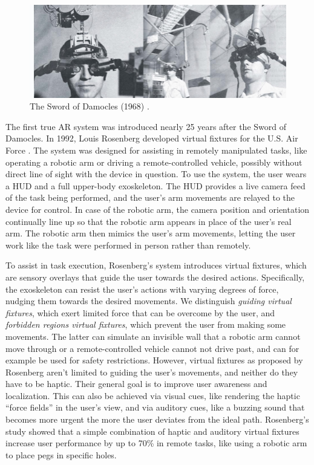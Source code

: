 \begin{figure}
    \centering
    \includegraphics[width=1.0\linewidth]{resources/introduction/sword_of_damocles.jpg}
    \caption{The Sword of Damocles (1968) \cite{sutherland1968head}.}
    \label{fig:sword_of_damocles}
\end{figure}

The first true AR system was introduced nearly 25 years after the Sword of Damocles. In 1992, Louis Rosenberg developed virtual fixtures for the U.S. Air Force \cite{rosenberg1992use}. The system was designed for assisting in remotely manipulated tasks, like operating a robotic arm or driving a remote-controlled vehicle, possibly without direct line of sight with the device in question. To use the system, the user wears a HUD and a full upper-body exoskeleton. The HUD provides a live camera feed of the task being performed, and the user's arm movements are relayed to the device for control. In case of the robotic arm, the camera position and orientation continually line up so that the robotic arm appears in place of the user's real arm. The robotic arm then mimics the user's arm movements, letting the user work like the task were performed in person rather than remotely.

To assist in task execution, Rosenberg's system introduces virtual fixtures, which are sensory overlays that guide the user towards the desired actions. Specifically, the exoskeleton can resist the user's actions with varying degrees of force, nudging them towards the desired movements. We distinguish \textit{guiding virtual fixtures}, which exert limited force that can be overcome by the user, and \textit{forbidden regions virtual fixtures}, which prevent the user from making some movements. The latter can simulate an invisible wall that a robotic arm cannot move through or a remote-controlled vehicle cannot not drive past, and can for example be used for safety restrictions. However, virtual fixtures as proposed by Rosenberg aren't limited to guiding the user's movements, and neither do they have to be haptic. Their general goal is to improve user awareness and localization. This can also be achieved via visual cues, like rendering the haptic ``force fields'' in the user's view, and via auditory cues, like a buzzing sound that becomes more urgent the more the user deviates from the ideal path. Rosenberg's study showed that a simple combination of haptic and auditory virtual fixtures increase user performance by up to 70\% in remote tasks, like using a robotic arm to place pegs in specific holes.

